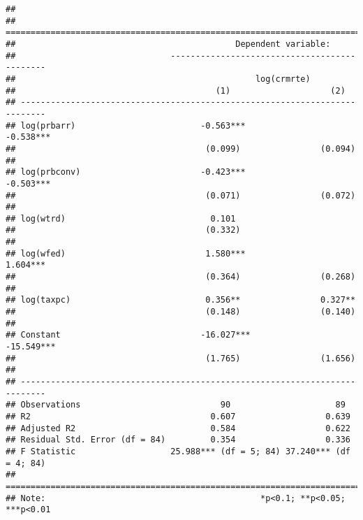 \documentclass[]{article}
\begin{document}
\begin{verbatim}
## 
## ===========================================================================
##                                            Dependent variable:             
##                               ---------------------------------------------
##                                                log(crmrte)                 
##                                        (1)                    (2)          
## ---------------------------------------------------------------------------
## log(prbarr)                         -0.563***              -0.538***       
##                                      (0.099)                (0.094)        
##                                                                            
## log(prbconv)                        -0.423***              -0.503***       
##                                      (0.071)                (0.072)        
##                                                                            
## log(wtrd)                             0.101                                
##                                      (0.332)                               
##                                                                            
## log(wfed)                            1.580***               1.604***       
##                                      (0.364)                (0.268)        
##                                                                            
## log(taxpc)                           0.356**                0.327**        
##                                      (0.148)                (0.140)        
##                                                                            
## Constant                            -16.027***             -15.549***      
##                                      (1.765)                (1.656)        
##                                                                            
## ---------------------------------------------------------------------------
## Observations                            90                     89          
## R2                                    0.607                  0.639         
## Adjusted R2                           0.584                  0.622         
## Residual Std. Error (df = 84)         0.354                  0.336         
## F Statistic                   25.988*** (df = 5; 84) 37.240*** (df = 4; 84)
## ===========================================================================
## Note:                                           *p<0.1; **p<0.05; ***p<0.01
\end{verbatim}
\end{document}
